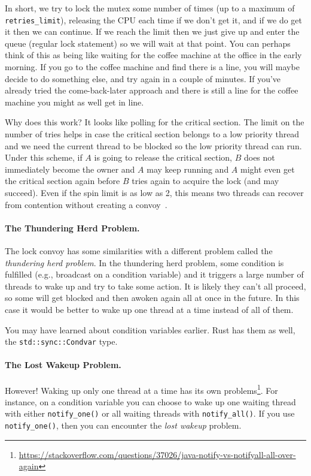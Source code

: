 In short, we try to lock the mutex some number of times (up to a maximum of \texttt{retries\_limit}), releasing the CPU each time if we don't get it, and if we do get it then we can continue. If we reach the limit then we just give up and enter the queue (regular lock statement) so we will wait at that point. You can perhaps think of this as being like waiting for the coffee machine at the office in the early morning. If you go to the coffee machine and find there is a line, you will maybe decide to do something else, and try again in a couple of minutes. If you've already tried the come-back-later approach and there is still a line for the coffee machine you might as well get in line.

Why does this work? It looks like polling for the critical section. The limit on the number of tries helps in case the critical section belongs to a low priority thread and we need the current thread to be blocked so the low priority thread can run. Under this scheme, if $A$ is going to release the critical section, $B$ does not immediately become the owner and $A$ may keep running and $A$ might even get the critical section again before $B$ tries again to acquire the lock (and may succeed). Even if the spin limit is as low as 2, this means two threads can recover from contention without creating a convoy~\cite{lockconvoys}. 

\paragraph{The Thundering Herd Problem.} The lock convoy has some similarities with a different problem called the \textit{thundering herd problem}. In the thundering herd problem, some condition is fulfilled (e.g., broadcast on a condition variable) and it triggers a large number of threads to wake up and try to take some action. It is likely they can't all proceed, so some will get blocked and then awoken again all at once in the future. In this case it would be better to wake up one thread at a time instead of all of them.

You may have learned about condition variables earlier. Rust has them as well, the \texttt{std::sync::Condvar} type.

\paragraph{The Lost Wakeup Problem.} However! Waking up only one thread at a time has its own problems\footnote{\url{https://stackoverflow.com/questions/37026/java-notify-vs-notifyall-all-over-again}}. For instance, on a condition variable you can choose to wake up one waiting thread with either \texttt{notify\_one()} or all waiting threads with \texttt{notify\_all()}. If you use \texttt{notify\_one()}, then you can encounter the \textit{lost wakeup} problem.


